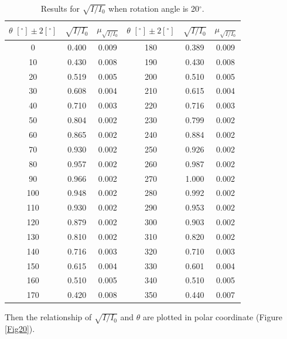 \documentclass{article}
\begin{document}
\begin{table}[H]\centering
\begin{tabular}{ccc||ccc}
\toprule
$\theta\,\,[^\circ] \pm 2[^\circ]$ & $\sqrt{I/I_0}$ & $\mu_{\sqrt{I/I_0}}$ & $\theta\,\,[^\circ] \pm 2[^\circ]$ & $\sqrt{I/I_0}$ & $\mu_{\sqrt{I/I_0}}$ \\
\midrule
0 & 0.400 & 0.009 & 180 & 0.389 & 0.009 \\
10 & 0.430 & 0.008 & 190 & 0.430 & 0.008 \\
20 & 0.519 & 0.005 & 200 & 0.510 & 0.005 \\
30 & 0.608 & 0.004 & 210 & 0.615 & 0.004 \\
40 & 0.710 & 0.003 & 220 & 0.716 & 0.003 \\
50 & 0.804 & 0.002 & 230 & 0.799 & 0.002 \\
60 & 0.865 & 0.002 & 240 & 0.884 & 0.002 \\
70 & 0.930 & 0.002 & 250 & 0.926 & 0.002 \\
80 & 0.957 & 0.002 & 260 & 0.987 & 0.002 \\
90 & 0.966 & 0.002 & 270 & 1.000 & 0.002 \\
100 & 0.948 & 0.002 & 280 & 0.992 & 0.002 \\
110 & 0.930 & 0.002 & 290 & 0.953 & 0.002 \\
120 & 0.879 & 0.002 & 300 & 0.903 & 0.002 \\
130 & 0.810 & 0.002 & 310 & 0.820 & 0.002 \\
140 & 0.716 & 0.003 & 320 & 0.710 & 0.003 \\
150 & 0.615 & 0.004 & 330 & 0.601 & 0.004 \\
160 & 0.510 & 0.005 & 340 & 0.510 & 0.005 \\
170 & 0.420 & 0.008 & 350 & 0.440 & 0.007  \\
\bottomrule
\end{tabular}
\caption{Results for $\sqrt{I/I_0}$ when rotation angle is 20$^\circ$.}\label{TableSqrt20}
\end{table}

Then the relationship of $\sqrt{I/I_0}$ and $\theta$ are plotted in polar coordinate (Figure \ref{Fig20}).
\end{document}
